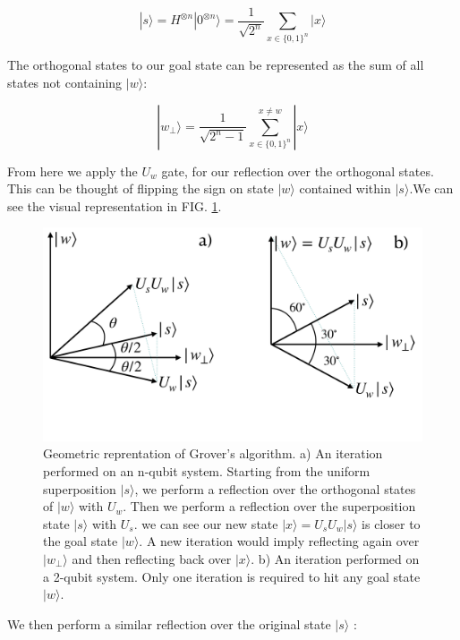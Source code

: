 \documentclass[twocolumn,showpacs,preprintnumbers,amsmath,amssymb]{revtex4}
\begin{document}
		\begin{equation}
			|s\rangle = H^{\otimes n} |0^{\otimes n} \rangle = \frac{1}{\sqrt{2^n}} \sum_{x\in\{0,1\}^n} |x\rangle
		\end{equation}

		The orthogonal states to our goal state can be represented as the sum of all states not containing $|w\rangle$:

		$$ |w_\perp\rangle=  \frac{1}{\sqrt{2^n -1}} \sum_{x\in\{0,1\}^n}^{x \neq w} |x\rangle$$		

		From here we apply the $U_w$ gate, for our reflection over the orthogonal states. This can be thought of flipping the sign on state $|w\rangle$ contained within $|s\rangle$.We can see the visual representation in FIG. \ref{fig:grovergeometric}. 
		\begin{figure}[!h]
			\centering
			\includegraphics[trim={0 7.5cm 0 0},clip, width=0.99\linewidth]{"graphics/grov_geom"}
			\caption{Geometric reprentation of Grover's algorithm.  a) An iteration performed on an n-qubit system.  Starting from the uniform superposition $|s\rangle$, we perform a reflection over the orthogonal states of $|w\rangle$ with $U_w$. Then we perform a reflection over the superposition state $|s\rangle$ with $U_s$. we can see our new state $|x\rangle = U_sU_w|s\rangle$ is closer to the goal state $|w\rangle$. A new iteration would imply reflecting again over $|w_\perp\rangle$ and then reflecting back over $|x\rangle$. b) An iteration performed on a 2-qubit system. Only one iteration is required to hit any goal state $|w\rangle$. }
			\label{fig:grovergeometric}
		\end{figure}
		

		
 		We then perform a similar reflection over the original state $|s\rangle$ :
		
\end{document}
